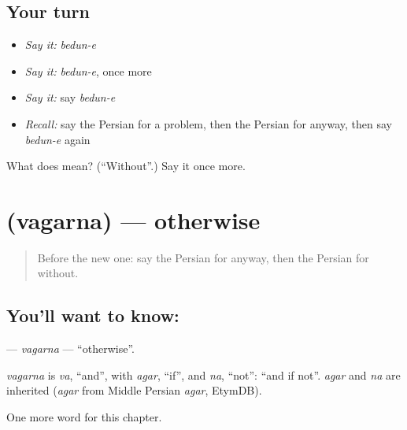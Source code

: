 \subsection*{Your turn}
\begin{itemize}
\raggedright
  \item \emph{Say it:} \emph{bedun-e}
  \item \emph{Say it:} \emph{bedun-e}, once more
  \item \emph{Say it:} say \emph{bedun-e}
  \item \emph{Recall:} say the Persian for a problem, then the Persian for anyway, then say \emph{bedun-e} again
\end{itemize}

\begin{tcolorbox}[breakable,colback=teal!4,colframe=teal!35!black,title={Before you move on}]
What does  mean? (\textquotedblleft{}Without\textquotedblright{}.) Say it once more.
\end{tcolorbox}
\section[\texorpdfstring{\fa{وگرنه} (vagarna)}{وگرنه (vagarna)}]{ (vagarna) — otherwise}

\label{lesson:FA-C159-vagarna}



\begin{quote}
Before the new one: say the Persian for anyway, then the Persian for without.
\end{quote}

\subsection*{You'll want to know: }
\textbf{} — \emph{vagarna} — \textquotedblleft{}otherwise\textquotedblright{}.

\begin{cousinweb}
\emph{vagarna} is \emph{va}, \textquotedblleft{}and\textquotedblright{}, with \emph{agar}, \textquotedblleft{}if\textquotedblright{}, and \emph{na}, \textquotedblleft{}not\textquotedblright{}: \textquotedblleft{}and if not\textquotedblright{}. \emph{agar} and \emph{na} are inherited (\emph{agar} from Middle Persian \emph{agar}, EtymDB).
\end{cousinweb}

\begin{grammarlens}[title={What you've built}]
One more word for this chapter.
\end{grammarlens}

